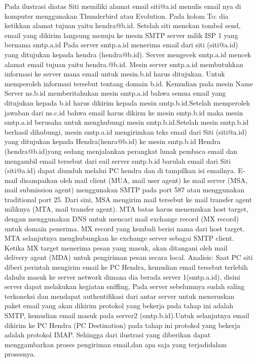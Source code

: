 Pada ilustrasi diatas Siti memiliki alamat email siti@a.id menulis email nya di komputer menggunakan Thunderbird atau Evolution. Pada kolom To: dia ketikkan alamat tujuan yaitu hendra@b.id. Setelah siti menekan tombol send, email yang dikirim langsung menuju ke mesin SMTP server milik ISP 1 yang bernama smtp.a.id
Pada server smtp.a.id menerima email dari siti (siti@a.id) yang ditujukan kepada hendra (hendra@b.id). Server mengecek smtp.a.id mencek alamat email tujuan yaitu hendra.@b.id. Mesin server smtp.a.id membutuhkan informasi ke server mana email untuk mesin.b.id harus ditujukan. Untuk memperoleh informasi tersebut tentang domain b.id. 
Kemudian pada mesin Name Server ns.b.id memberitahukan mesin smtp.a.id bahwa semua email yang ditujukan kepada b.id harus dikirim kepada mesin smtp.b.id.Setelah memperoleh jawaban dari ns.c.id bahwa email harus dikirm ke mesin smtp.b.id maka mesin smtp.a.id berusaha untuk menghubungi mesin smtp.b.id.Setelah mesin smtp.b.id berhasil dihubungi, mesin smtp.a.id mengirimkan teks email dari Siti (siti@a.id) yang ditujukan kepada Hendra(henra@b.id) ke mesin smtp.b.id 
Hendra (hendra@b.id)yang sedang menjalankan perangkat lunak pembaca email dan mengambil email tersebut dari eail server smtp.b.id barulah email dari Siti (siti@a.id) dapat diunduh melalui PC hendra dan di tampilkan isi emailnya. 
E-mail disampaikan oleh mail client (MUA, mail user agent) ke mail server (MSA, mail submission agent) menggunakan SMTP pada port 587 atau menggunakan traditional port 25. Dari sini, MSA mengirim mail tersebut ke mail transfer agent miliknya (MTA, mail transfer agent). MTA batas harus menemukan host target, dengan menggunakan DNS untuk mencari mail exchange record (MX record) untuk domain penerima. MX record yang kembali berisi nama dari host target. MTA selanjutnya menghubungkan ke exchange server sebagai SMTP client. Ketika MX target menerima pesan yang masuk, akan ditangani oleh mail delivery agent (MDA) untuk pengiriman pesan secara local. 
Analisis: Saat PC siti diberi perintah mengirim email ke PC Hendra, kemudian email tersebut terlebih dahulu masuk ke server network dimana dia berada server 1(smtp.a.id), disini server dapat melakukan kegiatan sniffing, Pada server sebelumnya sudah saling terkoneksi dan mendapat authentifikasi dari antar server untuk meneruskan paket email yang akan dikirim protokol yang bekerja pada tahap ini adalah SMTP, kemudian email masuk pada server2 (smtp.b.id).Untuk selanjutnya email dikirim ke PC Hendra (PC Destination) pada tahap ini protokol yang bekerja adalah protokol IMAP. Sehingga dari ilustrasi yang diberikan dapat menggambarkan proses pengiriman email,dan apa saja yang terjadidalam prosesnya. 
